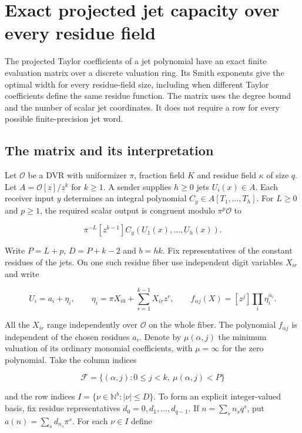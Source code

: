 \documentclass[11pt,a4paper]{article}
\begin{document}
\section{Exact projected jet capacity over every residue
field}\label{v8-section-jet-newton-smith}

The projected Taylor coefficients of a jet polynomial have an exact
finite evaluation matrix over a discrete valuation ring. Its Smith
exponents give the optimal width for every residue-field size, including
when different Taylor coefficients define the same residue function. The
matrix uses the degree bound and the number of scalar jet coordinates.
It does not require a row for every possible finite-precision jet word.

\subsection{The matrix and its
interpretation}\label{v8-the-matrix-and-its-interpretation}

Let \(\mathcal O\) be a DVR with uniformizer \(\pi\), fraction field
\(K\) and residue field \(\kappa\) of size \(q\). Let
\(A=\mathcal O[z]/z^k\) for \(k\ge1\). A sender supplies \(h\ge0\) jets
\(U_i(x)\in A\). Each receiver input \(y\) determines an integral
polynomial \(C_y\in A[T_1,\ldots,T_h]\). For \(L\ge0\) and \(p\ge1\),
the required scalar output is congruent modulo \(\pi^p\mathcal O\) to

\[
                 \pi^{-L}[z^{k-1}] C_y(U_1(x),\ldots,U_h(x)).
                 \tag{V8-A1}
\]

Write \(P=L+p\), \(D=P+k-2\) and \(b=hk\). Fix representatives of the
constant residues of the jets. On one such residue fiber use independent
digit variables \(X_{ir}\) and write

\[
 U_i=a_i+\eta_i,\qquad
 \eta_i=\pi X_{i0}+\sum_{r=1}^{k-1}X_{ir}z^r,\qquad
 f_{\alpha j}(X)=[z^j]\prod_i\eta_i^{\alpha_i}.
\]

All the \(X_{ir}\) range independently over \(\mathcal O\) on the whole
fiber. The polynomial \(f_{\alpha j}\) is independent of the chosen
residues \(a_i\). Denote by \(\mu(\alpha,j)\) the minimum valuation of
its ordinary monomial coefficients, with \(\mu=\infty\) for the zero
polynomial. Take the column indices

\[
 \mathcal F=\{(\alpha,j):0\le j<k,\ \mu(\alpha,j)<P\}
\]

and the row indices \(I=\{\nu\in\mathbb N^b:|\nu|\le D\}\). To form an
explicit integer-valued basis, fix residue representatives
\(d_0=0,d_1,\ldots,d_{q-1}\). If \(n=\sum_s n_s q^s\), put
\(a(n)=\sum_s d_{n_s}\pi^s\). For each \(\nu\in I\) define
\end{document}
